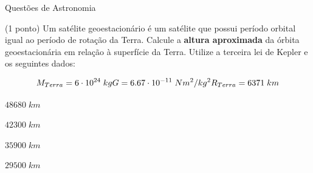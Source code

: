 \documentclass{../lista}
\begin{document}
\begin{secao}{Questões de Astronomia}
		\begin{questao}{(1 ponto)}
			Um satélite geoestacionário é um satélite que possui período orbital igual ao período de rotação da Terra. Calcule a \textbf{altura aproximada} da órbita geoestacionária em relação à superfície da Terra. Utilize a terceira lei de Kepler e os seguintes dados:
			
			\begin{equation}
				M_{Terra} = 6 \cdot 10^{24} \; kg \\
				G = 6.67 \cdot 10^{-11} \; N m^{2} / kg^{2} \\
				R_{Terra} = 6371 \; km
			\end{equation}
			
			\begin{alternativas}
				\item $48680 \; km$
				\item $42300 \; km$
				\item $35900 \; km$
				\item $29500 \; km$
			\end{alternativas}
		\end{questao}
	\end{secao}
\end{document}

